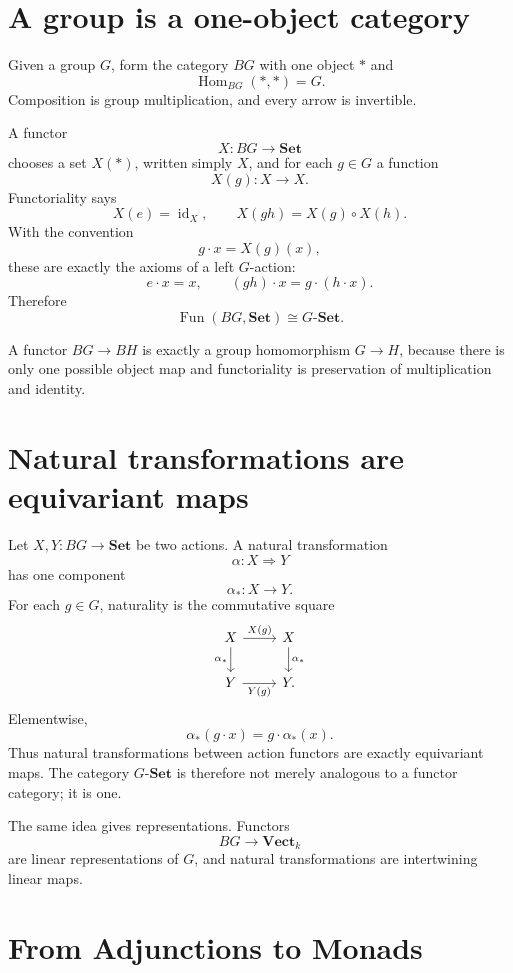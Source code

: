 \section{A group is a one-object category}

Given a group \(G\), form the category \(BG\) with one object \(*\) and
\[
  \operatorname{Hom}_{BG}(*,*)=G.
\]
Composition is group multiplication, and every arrow is invertible.

A functor
\[
  X:BG\to\mathbf{Set}
\]
chooses a set \(X(*)\), written simply \(X\), and for each \(g\in G\) a function
\[
  X(g):X\to X.
\]
Functoriality says
\[
  X(e)=\operatorname{id}_X,
  \qquad
  X(gh)=X(g)\circ X(h).
\]
With the convention
\[
  g\cdot x=X(g)(x),
\]
these are exactly the axioms of a left \(G\)-action:
\[
  e\cdot x=x,
  \qquad
  (gh)\cdot x=g\cdot(h\cdot x).
\]
Therefore
\[
  \boxed{
  \operatorname{Fun}(BG,\mathbf{Set})
  \cong
  G\text{-}\mathbf{Set}.}
\]

A functor \(BG\to BH\) is exactly a group homomorphism \(G\to H\), because there is only one possible object map and functoriality is preservation of multiplication and identity.

\section{Natural transformations are equivariant maps}

Let \(X,Y:BG\to\mathbf{Set}\) be two actions.  A natural transformation
\[
  \alpha:X\Rightarrow Y
\]
has one component
\[
  \alpha_*:X\to Y.
\]
For each \(g\in G\), naturality is the commutative square
\[
\begin{tikzcd}
X \arrow[r,"X(g)"] \arrow[d,"\alpha_*"']
  & X \arrow[d,"\alpha_*"] \\
Y \arrow[r,"Y(g)"']
  & Y.
\end{tikzcd}
\]
Elementwise,
\[
  \alpha_*(g\cdot x)=g\cdot\alpha_*(x).
\]
Thus natural transformations between action functors are exactly equivariant maps.  The category \(G\text{-}\mathbf{Set}\) is therefore not merely analogous to a functor category; it is one.

The same idea gives representations.  Functors
\[
  BG\to\mathbf{Vect}_k
\]
are linear representations of \(G\), and natural transformations are intertwining linear maps.

\section{From Adjunctions to Monads}

